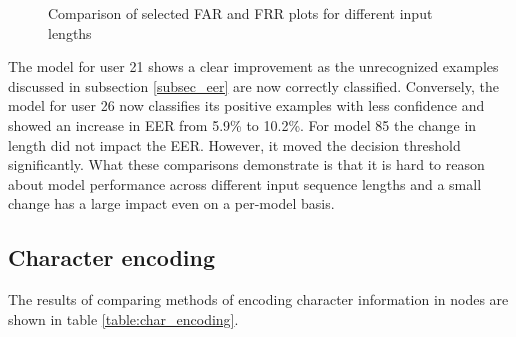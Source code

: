 \begin{figure}[H]
	\centering

	\caption{Comparison of selected FAR and FRR plots for different input lengths}
	\label{fig:selected_frr_vs_far}
\end{figure}

The model for user 21 shows a clear improvement as the unrecognized examples discussed in subsection \ref{subsec_eer} are now correctly classified. Conversely, the model for user 26 now classifies its positive examples with less confidence and showed an increase in EER from 5.9\% to 10.2\%. For model 85 the change in length did not impact the EER. However, it moved the decision threshold significantly.
What these comparisons demonstrate is that it is hard to reason about model performance across different input sequence lengths and a small change has a large impact even on a per-model basis.

\subsection{Character encoding}
The results of comparing methods of encoding character information in nodes are shown in table
\ref{table:char_encoding}.

